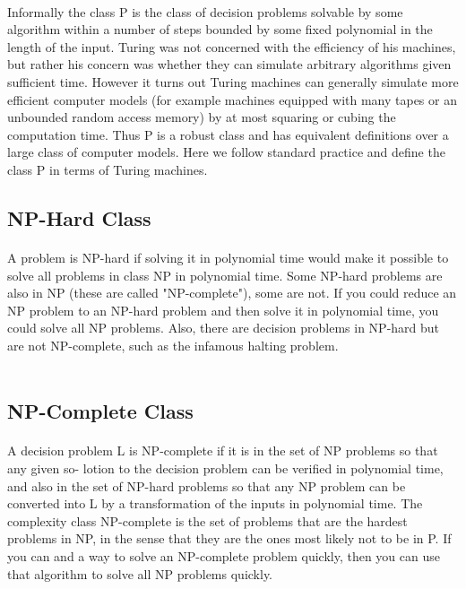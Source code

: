 \documentclass[11pt,a4paper]{report}
\begin{document}
\paragraph{}Informally the class P is the class of decision problems solvable by some algorithm within a number of steps bounded by some fixed polynomial in the length of the input. Turing was not concerned with the efficiency of his machines, but rather his concern was whether they can simulate arbitrary algorithms given sufficient time. However it turns out Turing machines can generally simulate more efficient computer models (for example machines equipped with many tapes or an unbounded random access memory) by at most squaring or cubing the computation time. Thus P is a robust class and has equivalent definitions over a large class of computer models. Here we follow standard practice and define the class P in terms of Turing machines.\\

\subsection{NP-Hard Class}
\paragraph{}A problem is NP-hard if solving it in polynomial time would make it possible to solve all problems in class NP in polynomial time. Some NP-hard problems are also in NP (these are called "NP-complete"), some are not. If you could reduce an NP problem to an NP-hard problem and then solve it in polynomial time, you could solve all NP problems. Also, there are decision problems in NP-hard but are not NP-complete, such as the infamous halting problem.\\
\\
\subsection{NP-Complete Class}
\paragraph{}A decision problem L is NP-complete if it is in the set of NP problems so that any given so- lotion to the decision problem can be verified in polynomial time, and also in the set of NP-hard problems so that any NP problem can be converted into L by a transformation of the inputs in polynomial time. The complexity class NP-complete is the set of problems that are the hardest problems in NP, in the sense that they are the ones most likely not to be in P. If you can and a way to solve an NP-complete problem quickly, then you can use that algorithm to solve all NP problems quickly.\\
\\
\end{document}
